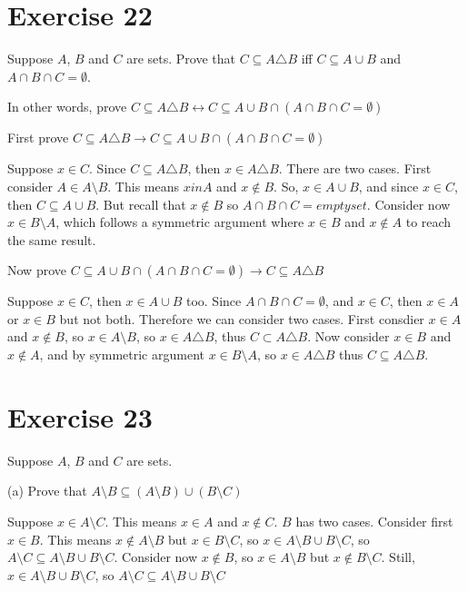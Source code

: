 \documentclass[11pt]{article}
\newcommand{\then}{\rightarrow}
\newcommand{\bicond}{\leftrightarrow}
\begin{document}
\section*{Exercise 22}

Suppose $A$, $B$ and $C$ are sets. Prove that $C \subseteq A \triangle B$ iff 
$C \subseteq A \cup B$ and $A \cap B \cap C = \emptyset$.

In other words, prove $C \subseteq A \triangle B \bicond 
C \subseteq A \cup B \cap (A \cap B \cap C = \emptyset)$

First prove $C \subseteq A \triangle B \then 
C \subseteq A \cup B \cap (A \cap B \cap C = \emptyset)$

Suppose $x \in C$. Since $C \subseteq A \triangle B$, then $x \in A \triangle B$.
There are two cases. First consider $A \in A \setminus B$. This means $x in A$ and
$x \notin B$. So, $x \in A \cup B$, and since $x \in C$, then $C \subseteq A \cup B$.
But recall that $x \notin B$ so $A \cap B \cap C = emptyset$. Consider now 
$x \in B \setminus A$, which follows a symmetric argument where $x \in B$ and 
$x \notin A$ to reach the same result.

Now prove $C \subseteq A \cup B \cap (A \cap B \cap C = \emptyset) \then 
C \subseteq A \triangle B$

Suppose $x \in C$, then $x \in A \cup B$ too. Since $A \cap B \cap C = \emptyset$, 
and $x \in C$, then $x \in A$ or $x \in B$ but not both. Therefore we can consider 
two cases. First consdier $x \in A$ and $x \notin B$, so $x \in A \setminus B$,
so $x \in A \triangle B$, thus $C \subset A \triangle B$. Now consider 
$x \in B$ and $x \notin A$, and by symmetric argument $x \in B \setminus A$, 
so $x \in A \triangle B$ thus $C \subseteq A \triangle B$.

\section*{Exercise 23}

Suppose $A$, $B$ and $C$ are sets.

\noindent (a) Prove that $A \setminus B \subseteq (A \setminus B) \cup (B \setminus C)$

Suppose $x \in A \setminus C$. This means $x \in A$ and $x \notin C$. $B$ has two
cases. Consider first $x \in B$. This means $x \notin A \setminus B$ but 
$x \in B \setminus C$, so $x \in A \setminus B \cup B \setminus C$, so 
$A \setminus C \subseteq A \setminus B \cup B \setminus C$. Consider now $x \notin B$,
so $x \in A \setminus B$ but $x \notin B \setminus C$. Still, 
$x \in A \setminus B \cup B \setminus C$, so 
$A \setminus C \subseteq A \setminus B \cup B \setminus C$
\end{document}
